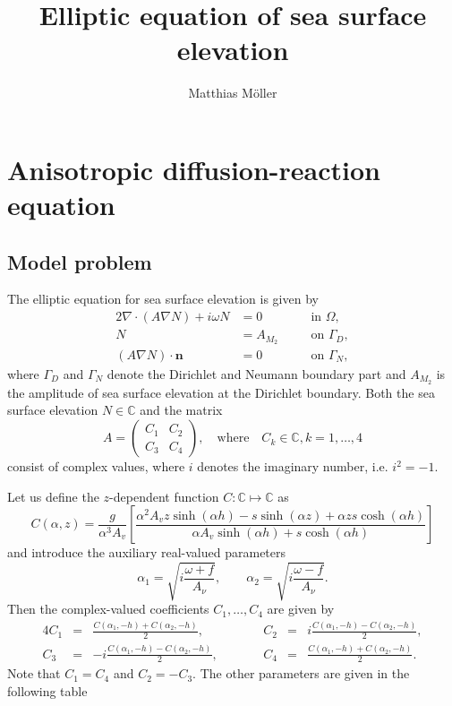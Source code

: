 \documentclass[11pt,a4paper]{article}
\title{Elliptic equation of sea surface elevation}
\author{Matthias M\"oller}
\begin{document}
\maketitle

\section{Anisotropic diffusion-reaction equation}
\subsection{Model problem}
The elliptic equation for sea surface elevation is given by
\begin{alignat}{2}
\nabla\cdot(A\nabla N)+i\omega N&=0  \quad && \text{in } \Omega,
\label{eq:sse_scalar1}\\
N&=A_{M_2} \quad && \text{on } \Gamma_D,
\label{eq:sse_scalar2}\\
(A\nabla N)\cdot\mathbf{n}&=0 \quad && \text{on } \Gamma_N,
\label{eq:sse_scatar3}
\end{alignat}
where $\Gamma_D$ and $\Gamma_N$ denote the Dirichlet and Neumann boundary part and $A_{M_2}$ is the amplitude of sea surface elevation at the Dirichlet boundary. Both the sea surface elevation $N\in\mathbb{C}$ and the matrix
$$
A=
\begin{pmatrix}
C_1 & C_2\\
C_3 & C_4
\end{pmatrix},\quad\text{where}\quad C_k\in\mathbb{C}, k=1,\dots,4
$$
consist of complex values, where $i$ denotes the imaginary number, i.e. $i^2=-1$.

Let us define the $z$-dependent function $C:\mathbb{C}\mapsto\mathbb{C}$ as
\begin{equation}
C(\alpha,z)=\frac{g}{\alpha^3A_v}\left[\frac{\alpha^2A_vz\sinh(\alpha h)-s\sinh(\alpha z)+\alpha z s \cosh(\alpha h)}{\alpha A_v\sinh(\alpha h)+s\cosh(\alpha h)}\right]
\end{equation}
and introduce the auxiliary real-valued parameters
$$
\alpha_1=\sqrt{i\frac{\omega+f}{A_\nu}},\qquad
\alpha_2=\sqrt{i\frac{\omega-f}{A_\nu}}.
$$
Then the complex-valued coefficients $C_1,\dots,C_4$ are given by
\begin{alignat}{4}
C_1&=&\frac{C(\alpha_1,-h)+C(\alpha_2,-h)}{2},&& \qquad
C_2&=&i\frac{C(\alpha_1,-h)-C(\alpha_2,-h)}{2},\\
C_3&=&-i\frac{C(\alpha_1,-h)-C(\alpha_2,-h)}{2},&&\qquad
C_4&=&\frac{C(\alpha_1,-h)+C(\alpha_2,-h)}{2}.
\end{alignat}
Note that $C_1=C_4$ and $C_2=-C_3$. The other parameters are given in the following table
\end{document}
